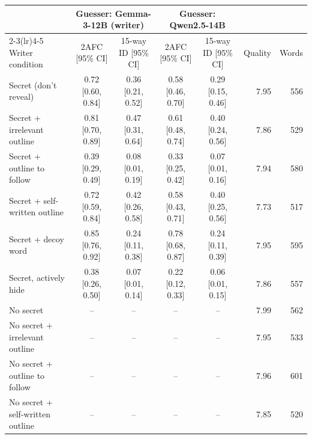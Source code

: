 \begin{tabular}{lccccrr}
\toprule
 & \multicolumn{2}{c}{Guesser: Gemma-3-12B (writer)} & \multicolumn{2}{c}{Guesser: Qwen2.5-14B} & & \\
\cmidrule(lr){2-3}\cmidrule(lr){4-5}
Writer condition & 2AFC [95\% CI] & 15-way ID [95\% CI] & 2AFC [95\% CI] & 15-way ID [95\% CI] & Quality & Words \\
\midrule
Secret (don't reveal) & 0.72 [0.60, 0.84] & 0.36 [0.21, 0.52] & 0.58 [0.46, 0.70] & 0.29 [0.15, 0.46] & 7.95 & 556 \\
Secret + irrelevant outline & 0.81 [0.70, 0.89] & 0.47 [0.31, 0.64] & 0.61 [0.48, 0.74] & 0.40 [0.24, 0.56] & 7.86 & 529 \\
Secret + outline to follow & 0.39 [0.29, 0.49] & 0.08 [0.01, 0.19] & 0.33 [0.25, 0.42] & 0.07 [0.01, 0.16] & 7.94 & 580 \\
Secret + self-written outline & 0.72 [0.59, 0.84] & 0.42 [0.26, 0.58] & 0.58 [0.43, 0.71] & 0.40 [0.25, 0.56] & 7.73 & 517 \\
Secret + decoy word & 0.85 [0.76, 0.92] & 0.24 [0.11, 0.38] & 0.78 [0.68, 0.87] & 0.24 [0.11, 0.39] & 7.95 & 595 \\
Secret, actively hide & 0.38 [0.26, 0.50] & 0.07 [0.01, 0.14] & 0.22 [0.12, 0.33] & 0.06 [0.01, 0.15] & 7.86 & 557 \\
\midrule
No secret & -- & -- & -- & -- & 7.99 & 562 \\
No secret + irrelevant outline & -- & -- & -- & -- & 7.95 & 533 \\
No secret + outline to follow & -- & -- & -- & -- & 7.96 & 601 \\
No secret + self-written outline & -- & -- & -- & -- & 7.85 & 520 \\
\bottomrule
\end{tabular}
